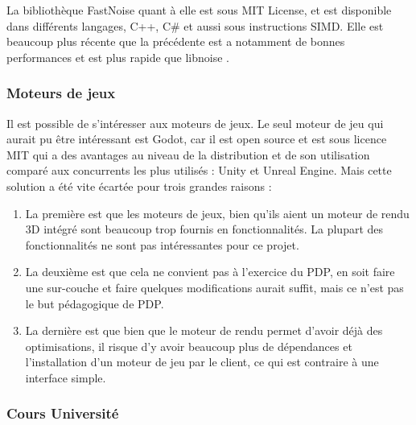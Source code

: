 \documentclass[a4paper]{article}
\begin{document}
    
    La bibliothèque FastNoise quant à elle est sous MIT License, et est disponible dans différents langages, C++, C\# et aussi sous instructions SIMD. Elle est beaucoup plus récente que la précédente est a notamment de bonnes performances et est plus rapide que libnoise \protect\footnotemark.\\
    
    
 \subsubsection{Moteurs de jeux}

    Il est possible de s'intéresser aux moteurs de jeux. Le seul moteur de jeu qui aurait pu être intéressant est Godot, car il est open source et est sous licence MIT qui a des avantages au niveau de la distribution et de son utilisation comparé aux concurrents les plus utilisés : Unity et Unreal Engine. Mais cette solution a été vite écartée pour trois grandes raisons : 
    \begin{enumerate}
        \item  La première est que les moteurs de jeux, bien qu'ils aient un moteur de rendu 3D intégré sont beaucoup trop fournis en fonctionnalités. La plupart des fonctionnalités ne sont pas intéressantes pour ce projet. 
        
        \item La deuxième est que cela ne convient pas à l'exercice du PDP, en soit faire une sur-couche et faire quelques modifications aurait suffit, mais ce n'est pas le but pédagogique de PDP.
        
        \item  La dernière est que bien que le moteur de rendu permet d'avoir déjà des optimisations, il risque d'y avoir beaucoup plus de dépendances et l'installation d'un moteur de jeu par le client, ce qui est contraire à une interface simple.
    \end{enumerate}

 \subsubsection{Cours Université}
    
\end{document}
